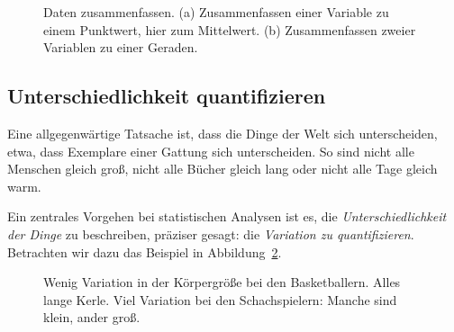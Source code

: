 \documentclass[
  letterpaper,
  twoside,
  open=any]{scrbook}
\theoremstyle{definition}
\theoremstyle{definition}
\theoremstyle{definition}
\theoremstyle{remark}
\begin{document}
\begin{figure}
\begin{minipage}{0.45\linewidth}
{}


\end{minipage}%

\caption{\label{fig-zsmnfassen}Daten zusammenfassen. (a) Zusammenfassen
einer Variable zu einem Punktwert, hier zum Mittelwert. (b)
Zusammenfassen zweier Variablen zu einer Geraden.}

\end{figure}%

\subsection{Unterschiedlichkeit
quantifizieren}\label{unterschiedlichkeit-quantifizieren}

Eine allgegenwärtige Tatsache ist, dass die Dinge der Welt sich
unterscheiden, etwa, dass Exemplare einer Gattung sich unterscheiden. So
sind nicht alle Menschen gleich groß, nicht alle Bücher gleich lang oder
nicht alle Tage gleich warm.

Ein zentrales Vorgehen bei statistischen Analysen ist es, die
\emph{Unterschiedlichkeit der Dinge} zu beschreiben, präziser gesagt:
die \emph{Variation zu quantifizieren}. Betrachten wir dazu das Beispiel
in Abbildung~\ref{fig-groesse}.

\begin{figure}


\caption{\label{fig-groesse}Wenig Variation in der Körpergröße bei den
Basketballern. Alles lange Kerle. Viel Variation bei den Schachspielern:
Manche sind klein, ander groß.}

\end{figure}%
\end{document}
